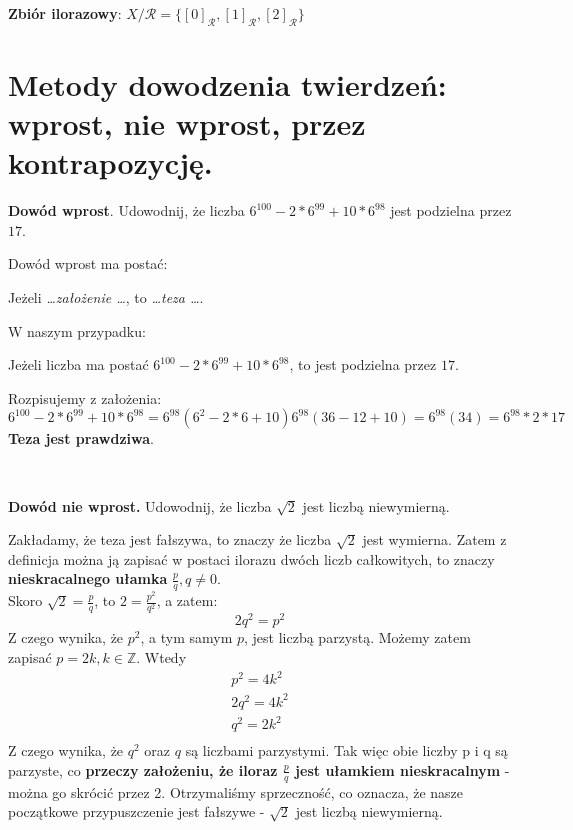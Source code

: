 \documentclass[main.tex]{subfiles}
\begin{document}
    \textbf{Zbiór ilorazowy}: $X/\mathcal{R} = \{[0]_{\mathcal{R}}, [1]_{\mathcal{R}}, [2]_{\mathcal{R}}\}$


    \newpage

    \section{Metody dowodzenia twierdzeń: wprost, nie wprost, przez kontrapozycję.}

    \begin{exercise}
        \textbf{Dowód wprost}. Udowodnij, że liczba $6^{100} - 2*6^{99} + 10*6^{98}$ jest podzielna przez $17$.
    \end{exercise}

    \noindent Dowód wprost ma postać:
    \begin{center}
        Jeżeli \textit{\ldots założenie \ldots}, to \textit{\ldots teza \ldots}.
    \end{center}

    \noindent W naszym przypadku:
    \begin{center}
        Jeżeli liczba ma postać $6^{100} - 2*6^{99} + 10*6^{98}$, to jest podzielna przez $17$.
    \end{center}

    \noindent Rozpisujemy z założenia:
    \[6^{100} - 2*6^{99} + 10*6^{98} = 6^{98}(6^2 - 2*6 + 10) 6^{98}(36 - 12 + 10) = 6^{98}(34) = 6^{98}*2*17\]
    \textbf{Teza jest prawdziwa}.

    \hfill \\

    \begin{exercise}
        \textbf{Dowód nie wprost.} Udowodnij, że liczba $\sqrt{2}$ jest liczbą niewymierną.
    \end{exercise}

    \noindent Zakładamy, że teza jest fałszywa, to znaczy że liczba $\sqrt{2}$ jest wymierna. Zatem z definicja można ją zapisać
    w postaci ilorazu dwóch liczb całkowitych, to znaczy \textbf{nieskracalnego ułamka} $\frac{p}{q}, q \neq 0$.\\

    Skoro $\sqrt{2} = \frac{p}{q}$, to $2 = \frac{p^2}{q^2}$, a zatem:
    \[ 2q^2 = p^2\]
    Z czego wynika, że $p^2$, a tym samym $p$, jest liczbą parzystą. Możemy zatem zapisać $p = 2k, k \in \mathbb{Z}$.
    Wtedy
    \begin{gather*}
        p^2 = 4k^2\\
        2q^2 = 4k^2\\
        q^2 = 2k^2\\
    \end{gather*}
    Z czego wynika, że $q^2$ oraz $q$ są liczbami parzystymi. Tak więc obie liczby p i q są parzyste, co \textbf{przeczy
    założeniu, że iloraz $\frac{p}{q}$ jest ułamkiem nieskracalnym} - można go skrócić przez 2. Otrzymaliśmy sprzeczność,
    co oznacza, że nasze początkowe przypuszczenie jest fałszywe -  $\sqrt{2}$ jest liczbą niewymierną.
\end{document}
